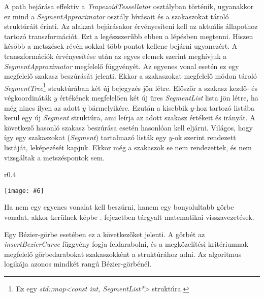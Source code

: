 \documentclass[12pt]{report}
\makeatletter
\theoremstyle{definition}
\newcommand{\func}[1]{{\textsl{#1}}}
\newcommand{\melyikoldalra}{r}
\newlength{\Xoffset}
\newlength{\Yoffset}
\newcommand*{\setpdfoffset}[2]{%
  \setlength{\Xoffset}{#1}%
  \setlength{\Yoffset}{#2}%
}
\newcommand*{\setviewport}[4]{%
  \def\x@viewport{%
    {\the\dimexpr#1-\Xoffset}
    {\the\dimexpr#2-\Yoffset}
    {\the\dimexpr#3-\Xoffset}
    {\the\dimexpr#4-\Yoffset}%
  }%
}
\newcommand{\includegraphicskivagas}[6]{
    \setpdfoffset{0pt}{0pt}
    \setviewport{#1}{#2}{#3}{#4}
    \texttt{[image: \#6]}
}
\newcommand{\includedataflowkivagas}[5]{
    \includegraphicskivagas{#1}{#2}{#3}{#4}{scale=0.6,#5}
    {img/built/dataflow_eps}
}
\makeatother
\begin{document}
A path bejárása effektív a \func{TrapezoidTessellator} osztályban történik,
ugyanakkor ez mind a \func{SegmentApproximator} osztály hívásait és a
szakaszokat tároló struktúráit érinti. Az alakzat bejárásakor érvényesíteni
kell az aktuális állapothoz tartozó transzformációt. Ezt a legészszerűbb ebben
a lépésben megtenni. Hiszen később a metszések révén sokkal több pontot kellene
bejárni ugyanezért. A transzformációk érvényesítése után az egyes elemek
szerint meghívjuk a \func{SegmentApproximator} megfelelő függvényét. Az egyenes
vonal esetén ez egy megfelelő szakasz beszúrását jelenti. Ekkor a szakaszokat
megfelelő módon tároló \func{SegmentTree}\footnote{Ez egy \func{std::map<const
int, SegmentList*>} struktúra.} struktúrában két új bejegyzés jön létre.
Először a szakasz kezdő- és végkoordináták $y$ értékének megfelelően két új
üres \func{SegmentList} lista jön létre, ha még nincs ilyen az adott $y$
bármelyikére. Ezután a kisebbik $y$-hoz tartozó listába kerül egy új
\func{Segment} struktúra, ami leírja az adott szakasz értékeit és irányát. A
következő hasonló szakasz beszúrása esetén hasonlóan kell eljárni. Világos,
hogy így egy szakaszokat (\func{Segment}) tartalmazó listák egy $y$-ok szerint
rendezett listáját, leképezését kapjuk. Ekkor még a szakaszok se nem
rendezettek, és nem vizsgáltak a metszéspontok sem.

  \begin{wrapfigure}{\melyikoldalra}{0.4\textwidth}
    \begin{center}
      \includedataflowkivagas{345pt}{400pt}{525pt}{590pt}{}
    \end{center}
    \caption{\label{fig:dataflow-segment} A szakasszá alakítás és a megközelítő
    visszavezetések \\ (Részlet \az+\emph{\ref{appendix:dataflow}.
    folyamatábrából}.)}
  \end{wrapfigure}

Ha nem egy egyenes vonalat kell beszúrni, hanem egy bonyolultabb görbe vonalat,
akkor kerülnek képbe . fejezetben tárgyalt matematikai
visszavezetések.

Egy Bézier-görbe esetében ez a következőket jelenti. A görbét az
\func{insertBezierCurve} függvény fogja feldarabolni, és a megközelítési
kritériumnak megfelelő görbedarabokat szakaszokként a struktúrához adni. Az
algoritmus logikája azonos mindkét rangú Bézier-görbénél.
\end{document}
